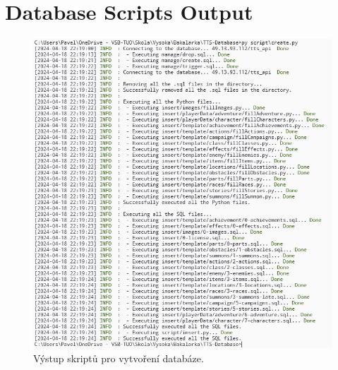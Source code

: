 \chapter{Database Scripts Output}
\label{ch:appendix-database-scripts-output}

\begin{figure}[h]
    \centering
    \includegraphics[width=1.0\textwidth]{figures/dbScriptsOutput}
    \caption{Výstup skriptů pro vytvoření databáze.}
    \label{fig:databaseScriptsOutput}
\end{figure}

\endinput